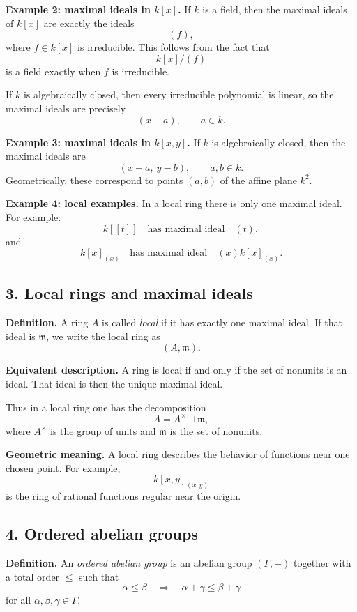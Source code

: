 \documentclass[12pt,a4paper]{article}
\theoremstyle{notespace}
\begin{document}
\textbf{Example 2: maximal ideals in \(k[x]\).}
If \(k\) is a field, then the maximal ideals of \(k[x]\) are exactly the ideals
\[
(f),
\]
where \(f\in k[x]\) is irreducible. This follows from the fact that
\[
k[x]/(f)
\]
is a field exactly when \(f\) is irreducible.

If \(k\) is algebraically closed, then every irreducible polynomial is linear, so the maximal ideals are precisely
\[
(x-a), \qquad a\in k.
\]

\textbf{Example 3: maximal ideals in \(k[x,y]\).}
If \(k\) is algebraically closed, then the maximal ideals are
\[
(x-a,\ y-b), \qquad a,b\in k.
\]
Geometrically, these correspond to points \((a,b)\) of the affine plane \(k^2\).

\textbf{Example 4: local examples.}
In a local ring there is only one maximal ideal. For example:
\[
k[[t]]
\quad \text{has maximal ideal} \quad
(t),
\]
and
\[
k[x]_{(x)}
\quad \text{has maximal ideal} \quad
(x)k[x]_{(x)}.
\]

\subsection{3. Local rings and maximal ideals}

\textbf{Definition.}
A ring \(A\) is called \emph{local} if it has exactly one maximal ideal. If that ideal is \(\mathfrak m\), we write the local ring as
\[
(A,\mathfrak m).
\]

\textbf{Equivalent description.}
A ring is local if and only if the set of nonunits is an ideal. That ideal is then the unique maximal ideal.

Thus in a local ring one has the decomposition
\[
A = A^\times \sqcup \mathfrak m,
\]
where \(A^\times\) is the group of units and \(\mathfrak m\) is the set of nonunits.

\textbf{Geometric meaning.}
A local ring describes the behavior of functions near one chosen point. For example,
\[
k[x,y]_{(x,y)}
\]
is the ring of rational functions regular near the origin.

\subsection{4. Ordered abelian groups}

\textbf{Definition.}
An \emph{ordered abelian group} is an abelian group \((\Gamma,+)\) together with a total order \(\le\) such that
\[
\alpha \le \beta
\quad \Longrightarrow \quad
\alpha+\gamma \le \beta+\gamma
\]
for all \(\alpha,\beta,\gamma\in \Gamma\).
\end{document}
